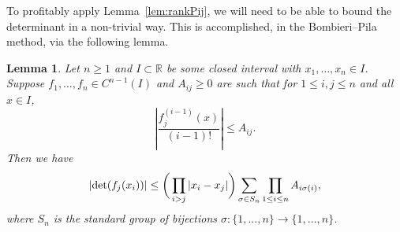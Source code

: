 \documentclass[12pt]{amsart}
\newcommand{\R}{{\mathbb R}}
\newcommand{\1}{{\mathbf 1}}
\newtheorem{lemma}[theorem]{Lemma}
\theoremstyle{remark}
\theoremstyle{definition}
\begin{document}
To profitably apply Lemma~\ref{lem:rankPij}, we will need to be able to bound the determinant in a non-trivial way. This is accomplished, in the Bombieri--Pila method, via the following lemma.

\begin{lemma}\label{prop:detdet}
Let $n\geq 1$ and $I\subset \R$ be some closed interval with $x_1,\ldots,x_{n}\in I$. Suppose $f_1,\ldots,f_{n}\in C^{n-1}(I)$ and $A_{ij}\geq 0$ are such that for $1\leq i,j\leq n$ and all $x \in I$, 
\[\left\lvert \frac{f_j^{(i-1)}(x)}{(i-1)!}\right\rvert\leq A_{ij}.\]
Then we have
\[
\left\lvert\det(f_j(x_i))\right\rvert\le  \bigg(\prod_{i>j}\abs{x_i-x_j}\bigg)\sum_{\sigma \in S_n}\prod_{1\leq i\leq n}A_{i\sigma(i)},\]
where $S_n$ is the standard group of bijections $\sigma:\{1,\ldots,n\}\to\{1,\ldots,n\}$.
\end{lemma}
\end{document}
